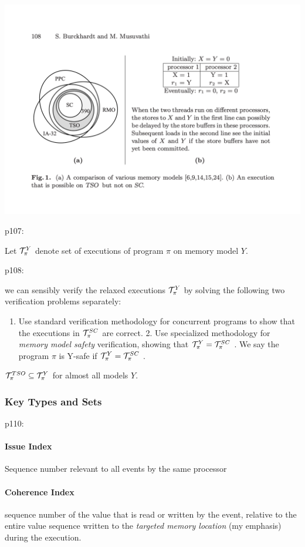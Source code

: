 \includegraphics[width=\textwidth]{../images/MModels-and-TSO-vs-SC-BurckhardtM08.pdf}

p107:

Let $\mathcal{T}_\pi^Y$ denote set of executions of program $\pi$
on memory model $Y$.

p108:

we can sensibly verify the relaxed executions
$\mathcal{T}_\pi^Y$
by solving the following two verification problems separately:
\begin{enumerate}
  \item
Use standard verification methodology for concurrent programs to show that
the executions in $\mathcal{T}_\pi^{SC}$ are correct.
2. Use specialized methodology for \emph{memory model safety} verification,
showing
that $\mathcal{T}_\pi^Y = \mathcal{T}_\pi^{SC}$ .
We say the program $\pi$ is Y-safe if $\mathcal{T}_\pi^Y =\mathcal{T}_\pi^{SC}$ .
\end{enumerate}

$\mathcal{T}_\pi^{TSO} \subseteq \mathcal{T}_\pi^Y$ for almost all models $Y$.


\subsubsection{Key Types and Sets}

p110:

\paragraph{Issue Index}
Sequence number relevant to all events by the same processor

\paragraph{Coherence Index}
sequence number of the value that is read or written by the event,
relative to the entire value sequence
written to the \emph{targeted memory location} (my emphasis) during the execution.

